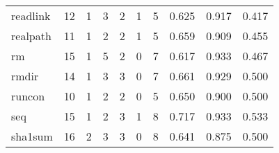\begin{longtable}{lp{1.3cm}p{1.3cm}p{1.3cm}p{1.3cm}p{1.3cm}p{1.3cm}p{1.3cm}p{1.3cm}p{1.3cm}}
readlink  &                     12 &                                             1 &                                            3 &                                           2 &                                            1 &                                          5 &                                0.625 &                                  0.917 &                                0.417 \\
realpath  &                     11 &                                             1 &                                            2 &                                           2 &                                            1 &                                          5 &                                0.659 &                                  0.909 &                                0.455 \\
rm        &                     15 &                                             1 &                                            5 &                                           2 &                                            0 &                                          7 &                                0.617 &                                  0.933 &                                0.467 \\
rmdir     &                     14 &                                             1 &                                            3 &                                           3 &                                            0 &                                          7 &                                0.661 &                                  0.929 &                                0.500 \\
runcon    &                     10 &                                             1 &                                            2 &                                           2 &                                            0 &                                          5 &                                0.650 &                                  0.900 &                                0.500 \\
seq       &                     15 &                                             1 &                                            2 &                                           3 &                                            1 &                                          8 &                                0.717 &                                  0.933 &                                0.533 \\
sha1sum   &                     16 &                                             2 &                                            3 &                                           3 &                                            0 &                                          8 &                                0.641 &                                  0.875 &                                0.500 \\

\end{longtable}
